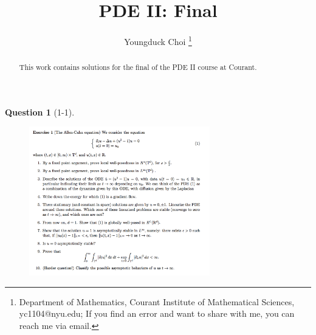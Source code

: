 \documentclass[11pt]{article}
\date{}
\title{\vspace{-0.7cm}
PDE II: Final}
\author{
Youngduck Choi 
\thanks{Department of Mathematics, Courant Institute of Mathematical Sciences, 
yc1104@nyu.edu; If you find an error and want to share with me, 
you can reach me via email.
}}
\theoremstyle{plain}
\theoremstyle{quest}
\newtheorem*{question}{Question}
\begin{document}
\maketitle

\begin{abstract}
This work contains solutions for the final of the PDE II course at Courant.
\end{abstract}


\begin{question}[1-1]
\hfill
\begin{figure}[h!]
  \centering
    \includegraphics[width=0.7\textwidth]{pde2-f-p1.png}
\end{figure}
\end{question}
\end{document}
